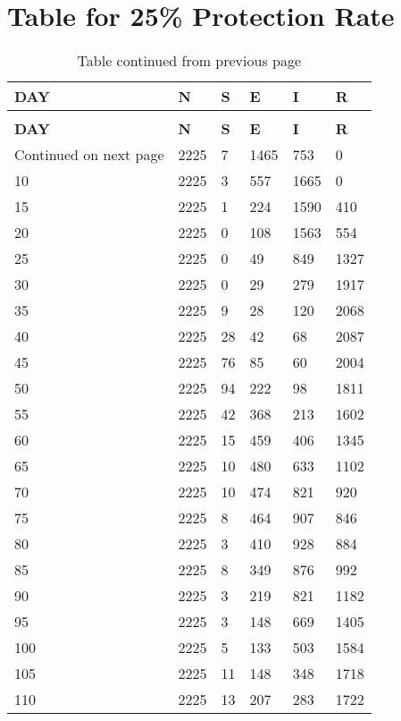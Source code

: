 \chapter{Table for 25\% Protection Rate}


\begin{longtable}{|l|l|l|l|l|l|}
	\caption{25\% Exposed Rate} \\
	
	\toprule
	\textbf{DAY} & \textbf{N} & \textbf{S} & \textbf{E }& \textbf{I} &\textbf{ R} \\
	\midrule
	\endfirsthead
	\caption*{Table continued from previous page} \\
	\toprule
	\textbf{DAY} & \textbf{N} & \textbf{S} & \textbf{E }& \textbf{I} &\textbf{ R} \\
	\midrule
	\endhead
	\midrule
	\multicolumn{1}{r}{\footnotesize Continued on next page}
	\endfoot
	\bottomrule
	\endlastfoot
5  & 2225 & 7   & 1465 & 753  & 0   \\
10 & 2225 & 3   & 557  & 1665 & 0   \\
15 & 2225 & 1   & 224  & 1590 & 410 \\
20 & 2225 & 0   & 108  & 1563 & 554 \\
25 & 2225 & 0   & 49   & 849  & 1327\\
30 & 2225 & 0   & 29   & 279  & 1917\\
35 & 2225 & 9   & 28   & 120  & 2068\\
40 & 2225 & 28  & 42   & 68   & 2087\\
45 & 2225 & 76  & 85   & 60   & 2004\\
50 & 2225 & 94  & 222  & 98   & 1811\\
55 & 2225 & 42  & 368  & 213  & 1602\\
60 & 2225 & 15  & 459  & 406  & 1345\\
65 & 2225 & 10  & 480  & 633  & 1102\\
70 & 2225 & 10  & 474  & 821  & 920 \\
75 & 2225 & 8   & 464  & 907  & 846 \\
80 & 2225 & 3   & 410  & 928  & 884 \\
85 & 2225 & 8   & 349  & 876  & 992 \\
90 & 2225 & 3   & 219  & 821  & 1182\\
95 & 2225 & 3   & 148  & 669  & 1405\\
100& 2225 & 5   & 133  & 503  & 1584\\
105& 2225 & 11  & 148  & 348  & 1718\\
110& 2225 & 13  & 207  & 283  & 1722\\

\end{longtable}
